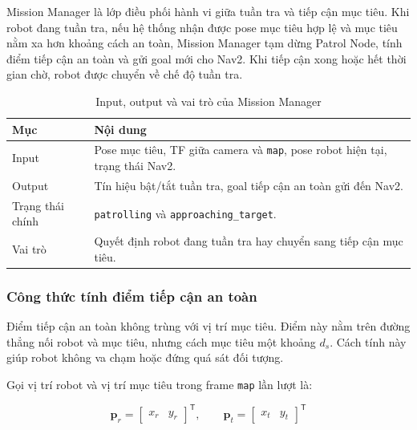 Mission Manager là lớp điều phối hành vi giữa tuần tra và tiếp cận mục tiêu. Khi robot đang tuần tra, nếu hệ thống nhận được pose mục tiêu hợp lệ và mục tiêu nằm xa hơn khoảng cách an toàn, Mission Manager tạm dừng Patrol Node, tính điểm tiếp cận an toàn và gửi goal mới cho Nav2. Khi tiếp cận xong hoặc hết thời gian chờ, robot được chuyển về chế độ tuần tra.

\begin{table}[H]
    \centering
    \caption{Input, output và vai trò của Mission Manager}
    \label{tab:mission-manager-io}
    \renewcommand{\arraystretch}{1.25}
    \small
    \begin{tabularx}{\textwidth}{|>{\raggedright\arraybackslash}p{}|>{\raggedright\arraybackslash}X|}
        \hline
        \textbf{Mục} & \textbf{Nội dung} \\
        \hline
        Input & Pose mục tiêu, TF giữa camera và \texttt{map}, pose robot hiện tại, trạng thái Nav2. \\
        \hline
        Output & Tín hiệu bật/tắt tuần tra, goal tiếp cận an toàn gửi đến Nav2. \\
        \hline
        Trạng thái chính & \texttt{patrolling} và \texttt{approaching\_target}. \\
        \hline
        Vai trò & Quyết định robot đang tuần tra hay chuyển sang tiếp cận mục tiêu. \\
        \hline
    \end{tabularx}
\end{table}

\subsubsection{Công thức tính điểm tiếp cận an toàn}
\label{subsubsec:safe-goal-formula}

Điểm tiếp cận an toàn không trùng với vị trí mục tiêu. Điểm này nằm trên đường thẳng nối robot và mục tiêu, nhưng cách mục tiêu một khoảng $d_s$. Cách tính này giúp robot không va chạm hoặc đứng quá sát đối tượng.

Gọi vị trí robot và vị trí mục tiêu trong frame \texttt{map} lần lượt là:

\begin{equation}
    \mathbf{p}_r =
    \begin{bmatrix}
        x_r & y_r
    \end{bmatrix}^{\mathsf{T}},
    \qquad
    \mathbf{p}_t =
    \begin{bmatrix}
        x_t & y_t
    \end{bmatrix}^{\mathsf{T}}
    \label{eq:robot-target-positions}
\end{equation}

